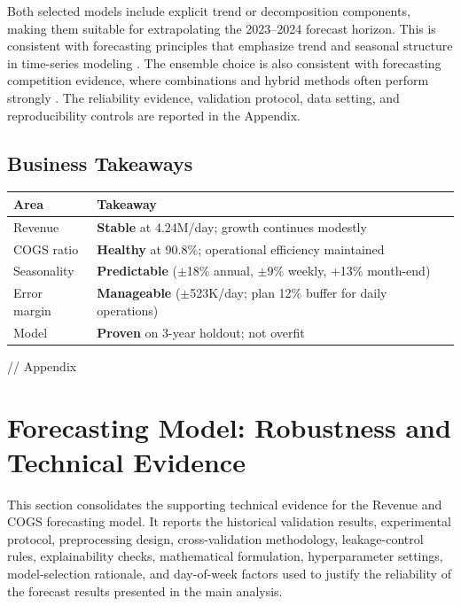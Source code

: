 \documentclass[12pt,a4paper]{article}
\begin{document}
Both selected models include explicit trend or decomposition components, making them suitable for extrapolating the 2023--2024 forecast horizon. This is consistent with forecasting principles that emphasize trend and seasonal structure in time-series modeling \cite{Hyndman2021}. The ensemble choice is also consistent with forecasting competition evidence, where combinations and hybrid methods often perform strongly \cite{Makridakis2020}. The reliability evidence, validation protocol, data setting, and reproducibility controls are reported in the Appendix.

\subsection*{Business Takeaways}

\begin{center}
\centering
{}
\label{tab:business-takeaways}
\small
\begin{tabular}{p{3.5cm}p{10cm}}
\toprule
\textbf{Area} & \textbf{Takeaway} \\
\midrule
Revenue & \textbf{Stable} at 4.24M/day; growth continues modestly \\
COGS ratio & \textbf{Healthy} at 90.8\%; operational efficiency maintained \\
Seasonality & \textbf{Predictable} ($\pm$18\% annual, $\pm$9\% weekly, +13\% month-end) \\
Error margin & \textbf{Manageable} ($\pm$523K/day; plan 12\% buffer for daily operations) \\
Model & \textbf{Proven} on 3-year holdout; not overfit \\
\bottomrule
\end{tabular}
\end{center}

\label{sec:part3}

// Appendix
\section{Forecasting Model: Robustness and Technical Evidence}
\label{sec:forecasting-model-technical-evidence}

This section consolidates the supporting technical evidence for the Revenue and COGS forecasting model. It reports the historical validation results, experimental protocol, preprocessing design, cross-validation methodology, leakage-control rules, explainability checks, mathematical formulation, hyperparameter settings, model-selection rationale, and day-of-week factors used to justify the reliability of the forecast results presented in the main analysis.
\end{document}
